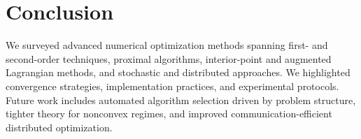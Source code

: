 \section{Conclusion}
\label{sec:conclusion}
We surveyed advanced numerical optimization methods spanning first- and second-order techniques, proximal algorithms, interior-point and augmented Lagrangian methods, and stochastic and distributed approaches. We highlighted convergence strategies, implementation practices, and experimental protocols. Future work includes automated algorithm selection driven by problem structure, tighter theory for nonconvex regimes, and improved communication-efficient distributed optimization.